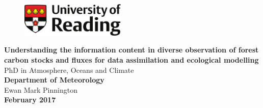 
\begin{titlepage}
\begin{flushright}
\begin{figure}[h]
\begin{flushright}
  \vspace{-2cm}
\includegraphics[width=50mm]{preface/figures/reading_logo.pdf} %
\end{flushright}
\end{figure}
\end{flushright}
\begin{flushleft}
  \vspace{4cm}
\Huge{\bf{Understanding the information content in diverse observation of forest carbon stocks and fluxes for data assimilation and ecological modelling}}\\ %
\huge{PhD in Atmosphere, Oceans and Climate} \\ %
\Large{\bf{Department of Meteorology}}\\ %
\vspace{2cm}
\huge{Ewan Mark Pinnington} \\ %
\Large{\bf{February 2017}}\\ %
\end{flushleft}
\end{titlepage}


